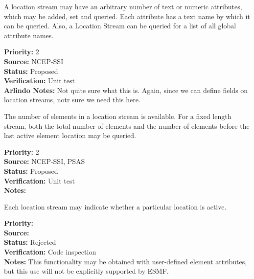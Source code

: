 
A location stream may have an arbitrary number of text or numeric attributes,
which may be added, set and queried.  Each attribute has a text name by which it
can be queried.  Also, a Location Stream can be queried for a list of all global
attribute names.

\begin{reqlist}
{\bf Priority:} 2 \\
{\bf Source:} NCEP-SSI \\
{\bf Status:} Proposed \\
{\bf Verification:} Unit test \\
{\bf Arlindo Notes:} Not quite sure what this is. Again, since we can define fields on location streams, notr sure we need this here. 
\end{reqlist}

The number of elements in a location stream is available.  For a fixed length stream,
both the total number of elements and the number of elements before the last
active element location may be queried.
\begin{reqlist}
{\bf Priority:} 2 \\
{\bf Source:} NCEP-SSI, PSAS\\
{\bf Status:} Proposed \\
{\bf Verification:} Unit test \\
{\bf Notes:} 
\end{reqlist}

Each location stream may indicate whether a particular location is active.

\begin{reqlist}
{\bf Priority:} \\
{\bf Source:} \\
{\bf Status:} Rejected \\
{\bf Verification:} Code inspection \\
{\bf Notes:} This functionality may be obtained with user-defined element
attributes, but this use will not be explicitly supported by ESMF.
\end{reqlist}


